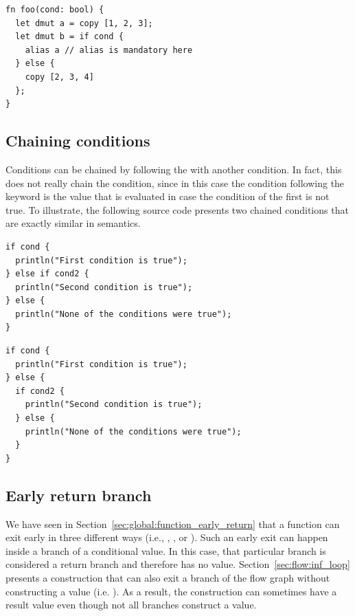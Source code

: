 \begin{lstlisting}[style=coloredverbatim, escapechar=@]
fn foo(cond: bool) {
  let dmut a = copy [1, 2, 3];
  let dmut b = if cond {
    alias a // alias is mandatory here
  } else {
    copy [2, 3, 4]
  };
}
\end{lstlisting}


\subsection{Chaining conditions}

Conditions can be chained by following the  with another
 condition. In fact, this does not really chain the condition, since
in this case the  condition following the  keyword is
the value that is evaluated in case the condition of the first  is
not true. To illustrate, the following source code presents two chained
 conditions that are exactly similar in semantics.


\begin{minipage}[t][][t]{0.47\linewidth}
\begin{lstlisting}[style=coloredverbatim, escapechar=@, caption=Using a \token{if} as the value of the \token{else} branch]
if cond {
  println("First condition is true");
} else if cond2 {
  println("Second condition is true");
} else {
  println("None of the conditions were true");
}
\end{lstlisting}
\end{minipage}\hspace{10pt}%
\begin{minipage}[t][][t]{0.47\linewidth}
  \begin{lstlisting}[style=coloredverbatim, escapechar=@, caption=Using a block as the value of the \token{else} branch]
if cond {
  println("First condition is true");
} else {
  if cond2 {
    println("Second condition is true");
  } else {
    println("None of the conditions were true");
  }
}
  \end{lstlisting}
\end{minipage}
\vspace{-10pt}%

\subsection{Early return branch}

We have seen in Section~\ref{sec:global:function_early_return} that a function can exit
early in three different ways (i.e., , , or
). Such an early exit can happen inside a branch of a conditional
value. In this case, that particular branch is considered a return branch and
therefore has no value. Section~\ref{sec:flow:inf_loop} presents a construction
that can also exit a branch of the flow graph without constructing a value (i.e.
). As a result, the  construction can sometimes have a
result value even though not all branches construct a value.

